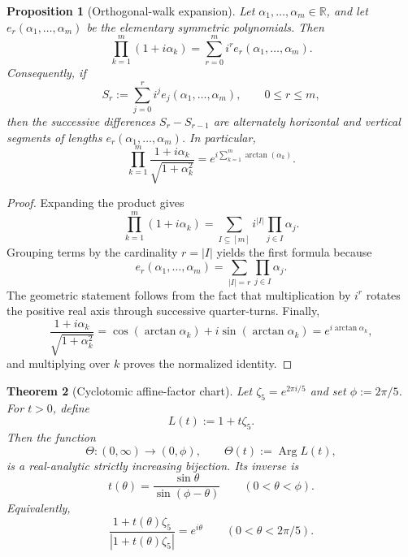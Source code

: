 \documentclass[11pt,a4paper]{article}
\newtheorem{theorem}{Theorem}[section]
\newtheorem{proposition}[theorem]{Proposition}
\theoremstyle{definition}
\theoremstyle{remark}
\DeclareMathOperator{\Arg}{Arg}
\newcommand{\RR}{\mathbb R}
\begin{document}
\begin{proposition}[Orthogonal-walk expansion]\label{prop:orthogonal-walk}
Let $\alpha_1,\dots,\alpha_m\in\RR$, and let $e_r(\alpha_1,\dots,\alpha_m)$ be the elementary symmetric polynomials.  Then
\[
\prod_{k=1}^m (1+i\alpha_k)=\sum_{r=0}^m i^r e_r(\alpha_1,\dots,\alpha_m).
\]
Consequently, if
\[
S_r:=\sum_{j=0}^r i^j e_j(\alpha_1,\dots,\alpha_m),
\qquad 0\le r\le m,
\]
then the successive differences $S_r-S_{r-1}$ are alternately horizontal and vertical segments of lengths $e_r(\alpha_1,\dots,\alpha_m)$.  In particular,
\[
\prod_{k=1}^m \frac{1+i\alpha_k}{\sqrt{1+\alpha_k^2}}
=e^{i\sum_{k=1}^m\arctan(\alpha_k)}.
\]
\end{proposition}

\begin{proof}
Expanding the product gives
\[
\prod_{k=1}^m(1+i\alpha_k)=\sum_{I\subseteq [m]} i^{|I|}\prod_{j\in I}\alpha_j.
\]
Grouping terms by the cardinality $r=|I|$ yields the first formula because
\[
e_r(\alpha_1,\dots,\alpha_m)=\sum_{|I|=r}\prod_{j\in I}\alpha_j.
\]
The geometric statement follows from the fact that multiplication by $i^r$ rotates the positive real axis through successive quarter-turns.  Finally,
\[
\frac{1+i\alpha_k}{\sqrt{1+\alpha_k^2}}
=\cos(\arctan\alpha_k)+i\sin(\arctan\alpha_k)
=e^{i\arctan\alpha_k},
\]
and multiplying over $k$ proves the normalized identity.
\end{proof}

\begin{theorem}[Cyclotomic affine-factor chart]\label{thm:cyclotomic-chart}
Let $\zeta_5=e^{2\pi i/5}$ and set $\phi:=2\pi/5$.  For $t>0$, define
\[
L(t):=1+t\zeta_5.
\]
Then the function
\[
\Theta:(0,\infty)\to(0,\phi),\qquad \Theta(t):=\Arg L(t),
\]
is a real-analytic strictly increasing bijection.  Its inverse is
\[
t(\theta)=\frac{\sin\theta}{\sin(\phi-\theta)}
\qquad (0<\theta<\phi).
\]
Equivalently,
\[
\frac{1+t(\theta)\zeta_5}{|1+t(\theta)\zeta_5|}=e^{i\theta}
\qquad (0<\theta<2\pi/5).
\]
\end{theorem}
\end{document}
